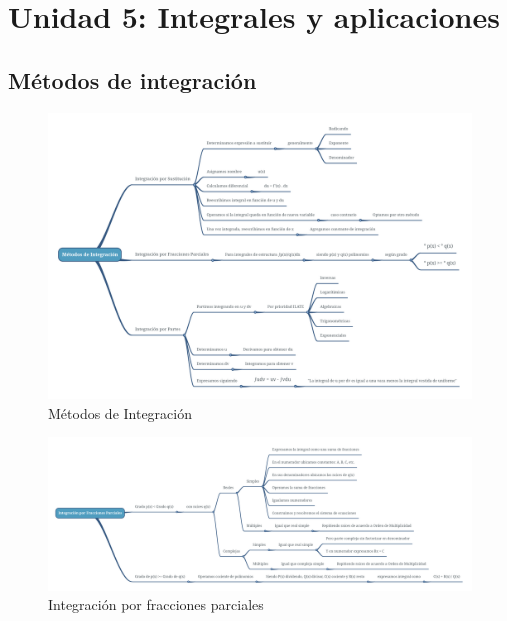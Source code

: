 \section*{Unidad 5: Integrales y aplicaciones}

\subsection*{Métodos de integración}

\begin{figure}
    \centering
    \includegraphics[width=20cm, angle=270]{img/metodos integracion.png}
    \caption{Métodos de Integración}
    \label{fig:metodos-integracion}
\end{figure}

\begin{figure}
    \centering
    \includegraphics[width=22cm, angle=270]{img/integracion por fracciones parciales.png}
    \caption{Integración por fracciones parciales}
    \label{fig:integracion-fracciones-parciales}
\end{figure}
